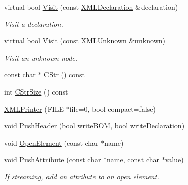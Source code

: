 \begin{DoxyCompactItemize}
\mbox{\label{classtinyxml2_1_1XMLPrinter_acfc625b2549304b9c7eb85ebd5c5eb39}} 
virtual bool \hyperlink{classtinyxml2_1_1XMLPrinter_acfc625b2549304b9c7eb85ebd5c5eb39}{Visit} (const \hyperlink{classtinyxml2_1_1XMLDeclaration}{X\+M\+L\+Declaration} \&declaration)
\begin{DoxyCompactList}\small\item\em Visit a declaration. \end{DoxyCompactList}\item 
\mbox{\label{classtinyxml2_1_1XMLPrinter_ab8af5455bbf9e4be2663e6642fcd7e32}} 
virtual bool \hyperlink{classtinyxml2_1_1XMLPrinter_ab8af5455bbf9e4be2663e6642fcd7e32}{Visit} (const \hyperlink{classtinyxml2_1_1XMLUnknown}{X\+M\+L\+Unknown} \&unknown)
\begin{DoxyCompactList}\small\item\em Visit an unknown node. \end{DoxyCompactList}\item 
const char $\ast$ \hyperlink{classtinyxml2_1_1XMLPrinter_a180671d73844f159f2d4aafbc11d106e}{C\+Str} () const
\item 
int \hyperlink{classtinyxml2_1_1XMLPrinter_a3256cf3523d4898b91abb18b924be04c}{C\+Str\+Size} () const
\item 
\hyperlink{classtinyxml2_1_1XMLPrinter_ad1eb8de568ceac1429cf04c66a349bd6}{X\+M\+L\+Printer} (F\+I\+LE $\ast$file=0, bool compact=false)
\item 
void \hyperlink{classtinyxml2_1_1XMLPrinter_a178c608ce8476043d5d6513819cde903}{Push\+Header} (bool write\+B\+OM, bool write\+Declaration)
\item 
void \hyperlink{classtinyxml2_1_1XMLPrinter_aa10d330818dbc31b44e9ffc27618bdfb}{Open\+Element} (const char $\ast$name)
\item 
\mbox{\label{classtinyxml2_1_1XMLPrinter_a9a4e2c9348b42e147629d5a99f4af3f0}} 
void \hyperlink{classtinyxml2_1_1XMLPrinter_a9a4e2c9348b42e147629d5a99f4af3f0}{Push\+Attribute} (const char $\ast$name, const char $\ast$value)
\begin{DoxyCompactList}\small\item\em If streaming, add an attribute to an open element. \end{DoxyCompactList}\item 
\mbox{\label{classtinyxml2_1_1XMLPrinter_a69120c82088597372d28d0a98f2ee7a1}} 

\end{DoxyCompactItemize}
